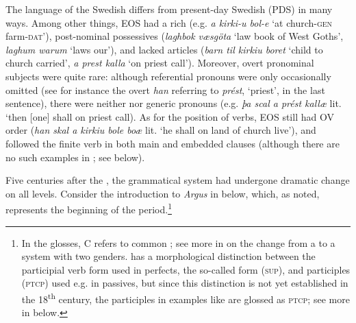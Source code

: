 \documentclass[output=paper]{langscibook}
\begin{document}
The language of the Swedish  differs from present-day Swedish (PDS) in many ways. Among other things, EOS had a rich  (e.g. \textit{a kirki-u bol-e} ‘at church-\textsc{gen} farm-\textsc{dat’}), post-nominal possessives (\textit{laghbok væsgöta} ‘law book of West Goths’, \textit{laghum warum} ‘laws our’), and lacked  articles (\textit{barn til kirkiu boret} ‘child to church carried’, \textit{a prest kalla} ‘on priest call’). Moreover, overt pronominal subjects were quite rare: although referential pronouns were only occasionally omitted (see for instance the overt \textit{han} referring to \textit{prést}, ‘priest’, in the last sentence), there were neither  nor generic pronouns (e.g. \textit{þa scal a prést kallæ} lit. ‘then [one] shall on priest call). As for the position of verbs, EOS still had OV order (\textit{han skal a kirkiu bole boæ} lit. ‘he shall on land of church live’), and  followed the finite verb in both main and embedded clauses (although there are no such examples in ; see  below).



Five centuries after the , the grammatical system had undergone dramatic change on all levels. Consider the introduction to \textit{Argus} in  below, which, as noted, represents the beginning of the  period.\footnote{In the glosses, \textsc{C} refers to common ; see more in  on the change from a  to a system with two genders.  has a morphological distinction between the participial verb form used in perfects, the so-called  form (\textsc{sup}), and  participles (\textsc{ptcp)} used e.g. in passives, but since this distinction is not yet established in the 18\textsuperscript{th} century, the participles in examples like  are glossed as \textsc{ptcp}; see more in  below.}
\end{document}

